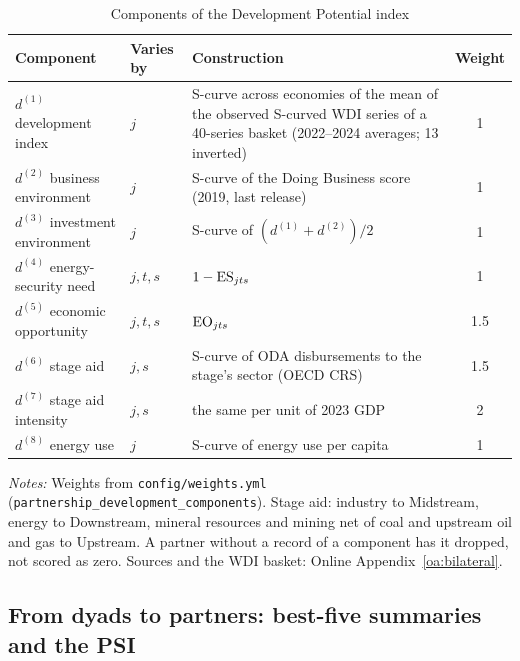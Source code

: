 \begin{table}[tbp]
\centering
\begin{threeparttable}
\caption{Components of the Development Potential index}
\label{tab:dp_components}
\footnotesize
\begin{tabularx}{\textwidth}{@{}l l >{\raggedright\arraybackslash}X c@{}}
\toprule
Component & Varies by & Construction & Weight\\
\midrule
$d^{(1)}$ development index & $j$ & S-curve across economies of the mean of the observed
  S-curved WDI series of a 40-series basket (2022--2024 averages; 13 inverted) & 1\\
$d^{(2)}$ business environment & $j$ & S-curve of the Doing Business score (2019, last release) & 1\\
$d^{(3)}$ investment environment & $j$ & S-curve of $(d^{(1)}+d^{(2)})/2$ & 1\\
$d^{(4)}$ energy-security need & $j,t,s$ & $1-\mathrm{ES}_{jts}$ & 1\\
$d^{(5)}$ economic opportunity & $j,t,s$ & $\mathrm{EO}_{jts}$ & 1.5\\
$d^{(6)}$ stage aid & $j,s$ & S-curve of ODA disbursements to the stage's sector (OECD CRS) & 1.5\\
$d^{(7)}$ stage aid intensity & $j,s$ & the same per unit of 2023 GDP & 2\\
$d^{(8)}$ energy use & $j$ & S-curve of energy use per capita & 1\\
\bottomrule
\end{tabularx}
\begin{tablenotes}[flushleft]\footnotesize
\item \textit{Notes:} Weights from \texttt{config/weights.yml}
(\texttt{partnership\_development\_components}). Stage aid: industry to Midstream, energy to
Downstream, mineral resources and mining net of coal and upstream oil and gas to Upstream. A
partner without a record of a component has it dropped, not scored as zero. Sources and the WDI
basket: Online Appendix~\ref{oa:bilateral}.
\end{tablenotes}
\end{threeparttable}
\end{table}

\subsection{From dyads to partners: best-five summaries and the PSI}\label{subsec:psi}

